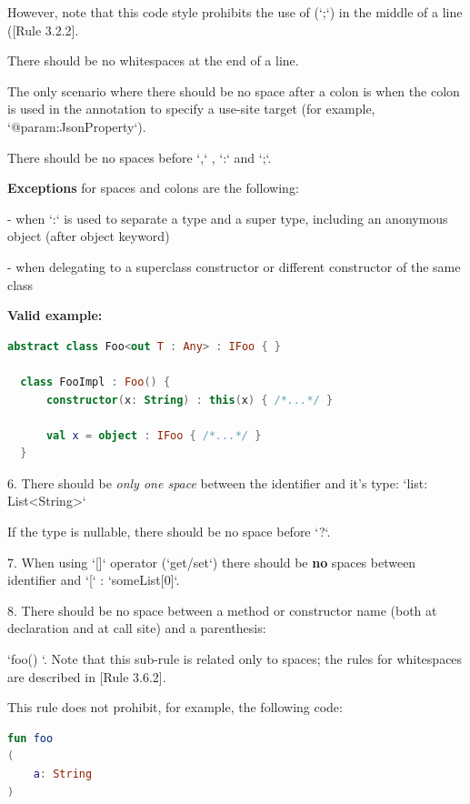 {{{{    However, note that this code style prohibits the use of (`;`) in the middle of a line ([Rule 3.2.2].

    There should be no whitespaces at the end of a line.

    The only scenario where there should be no space after a colon is when the colon is used in the annotation to specify a use-site target (for example, `@param:JsonProperty`).

    There should be no spaces before `,` , `:` and `;`.

    \textbf{Exceptions} for spaces and colons are the following:



    - when `:` is used to separate a type and a super type, including an anonymous object (after object keyword)

    - when delegating to a superclass constructor or different constructor of the same class



\textbf{Valid example:}

\begin{lstlisting}[language=Kotlin]
  abstract class Foo<out T : Any> : IFoo { }

  class FooImpl : Foo() {
      constructor(x: String) : this(x) { /*...*/ }

      val x = object : IFoo { /*...*/ }
  }
\end{lstlisting}


6. There should be \textit{only one space} between the identifier and it's type: `list: List<String>`

If the type is nullable, there should be no space before `?`.



7. When using `[]` operator (`get/set`) there should be \textbf{no} spaces between identifier and `[` : `someList[0]`.



8. There should be no space between a method or constructor name (both at declaration and at call site) and a parenthesis:

   `foo() {}`. Note that this sub-rule is related only to spaces; the rules for whitespaces are described in [Rule 3.6.2].

    This rule does not prohibit, for example, the following code:

\begin{lstlisting}[language=Kotlin]
fun foo
(
    a: String
)
\end{lstlisting}


}}}}
